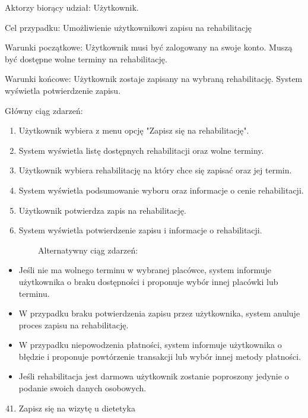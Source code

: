 \documentclass[
]{article}
\providecommand{\tightlist}{%
  \setlength{\itemsep}{0pt}\setlength{\parskip}{0pt}}
\begin{document}
{Aktorzy biorący udział: Użytkownik.}

{Cel przypadku: Umożliwienie użytkownikowi zapisu na rehabilitację}

{Warunki początkowe: Użytkownik musi być zalogowany na swoje konto.
Muszą być dostępne wolne terminy na rehabilitację.}

{Warunki końcowe: Użytkownik zostaje zapisany na wybraną rehabilitację.
System wyświetla potwierdzenie zapisu.}

{Główny ciąg zdarzeń:}

\begin{enumerate}
\tightlist
\item
  {Użytkownik wybiera z menu opcję "Zapisz się na rehabilitację".}
\item
  {System wyświetla listę dostępnych rehabilitacji oraz wolne terminy.}
\item
  {Użytkownik wybiera rehabilitację na który chce się zapisać oraz jej
  termin.}
\item
  {System wyświetla podsumowanie wyboru oraz informacje o cenie
  rehabilitacji.}
\item
  {Użytkownik potwierdza zapis na rehabilitację.}
\item
  {System wyświetla potwierdzenie zapisu i informacje o rehabilitacji.}
\end{enumerate}

{~~~~~~~~Alternatywny ciąg zdarzeń:}

\begin{itemize}
\tightlist
\item
  {Jeśli nie ma wolnego terminu w wybranej placówce, system informuje
  użytkownika o braku dostępności i proponuje wybór innej placówki lub
  terminu.}
\item
  {W przypadku braku potwierdzenia zapisu przez użytkownika, system
  anuluje proces zapisu na rehabilitację.}
\item
  {W przypadku niepowodzenia płatności, system informuje użytkownika o
  błędzie i proponuje powtórzenie transakcji lub wybór innej metody
  płatności.}
\item
  {Jeśli rehabilitacja jest darmowa użytkownik zostanie poproszony
  jedynie o podanie swoich danych osobowych.}
\end{itemize}

{\hfill\break
}

\begin{enumerate}
\setcounter{enumi}{40}
\tightlist
\item
  {Zapisz się na wizytę u dietetyka}
\end{enumerate}
\end{document}
